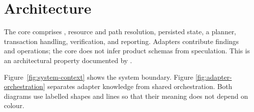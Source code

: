 \section{Architecture}
\label{chap:architecture}

The core comprises \ProjectContext{}, resource and path resolution, persisted state, a
planner, transaction handling, verification, and reporting. Adapters contribute findings
and operations; the core does not infer product schemas from speculation. This is an
\Implemented{} architectural property documented by .

Figure~\ref{fig:system-context} shows the system boundary. Figure
\ref{fig:adapter-orchestration} separates adapter knowledge from shared orchestration.
Both diagrams use labelled shapes and lines so that their meaning does not depend on
colour.
